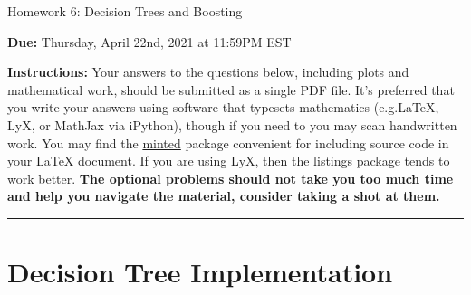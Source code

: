 \documentclass{article}
\newcommand{\ruleskip}{\bigskip\hrule\bigskip}
\theoremstyle{plain}
\theoremstyle{definition}
\begin{document}

\pagestyle{myheadings} 

\begin{center}
{\Large
Homework 6: Decision Trees and Boosting
} 
\end{center}

{
{ \color{nyupurple} \textbf{Due:} Thursday, April 22nd, 2021 at 11:59PM EST} 
} 

\textbf{Instructions: }Your answers to the questions below, including plots and mathematical work, should be submitted as a single PDF file.  It's preferred that you write your answers using software that typesets mathematics (e.g.LaTeX, LyX, or MathJax via iPython), though if you need to you may scan handwritten work.  You may find the \href{https://github.com/gpoore/minted}{minted} package convenient for including source code in your LaTeX document.  If you are using LyX, then the \href{https://en.wikibooks.org/wiki/LaTeX/Source_Code_Listings}{listings} package tends to work better. {\bf The optional problems should not take you too much time and help you navigate the material, consider taking a shot at them.}

\ruleskip




\section{Decision Tree Implementation}
\end{document}
